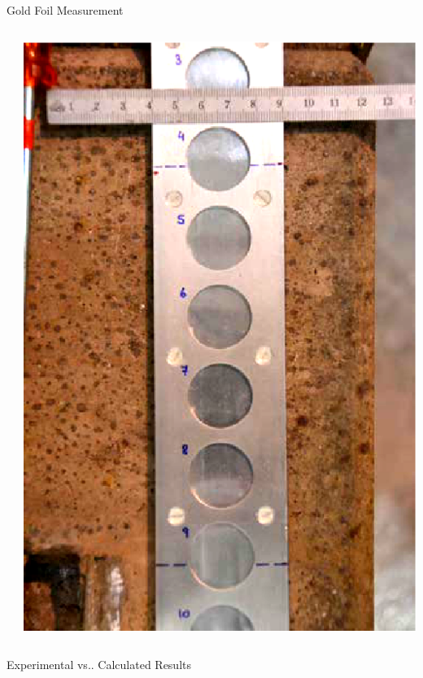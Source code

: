 \documentclass[final,t]{beamer}
\makeatletter
\DeclareRobustCommand\onedot{\futurelet\@let@token\@onedot}
\def\@onedot{\ifx\@let@token.\else.\null\fi\xspace}
\def\vs{{vs}\onedot}
\makeatother
\begin{document}
\begin{frame}{}
\begin{columns}[t]
\begin{column}{.3\linewidth}
\begin{block}{Gold Foil Measurement}
\begin{columns}[T]
\begin{column}{.65\linewidth}
            
          \end{column}
          \begin{column}{.35\linewidth}
            \includegraphics*[angle=90,width=\linewidth]{foils.eps}
          \end{column}
        \end{columns}
      \end{block}


      \begin{block}{Experimental \vs Calculated Results}

      \begin{columns}


\end{columns}
\end{block}
\end{column}
\end{columns}
\end{frame}
\end{document}
